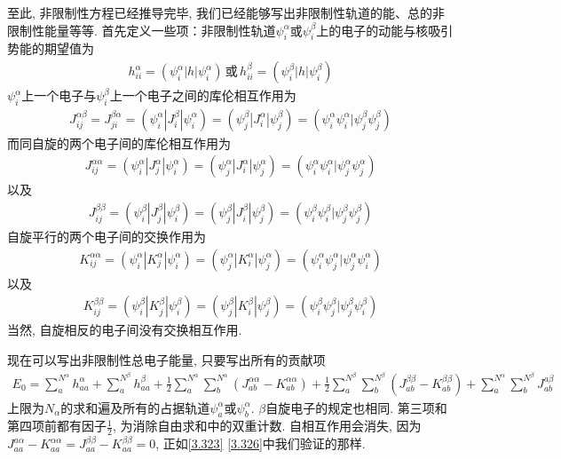 至此, 
非限制性\hft 方程已经推导完毕, 
我们已经能够写出非限制性轨道的能、总的非限制性能量等等. 
首先定义一些项：非限制性轨道$\psi_i^\alpha$或$\psi_i^\beta$上的电子的动能与核吸引势能的期望值为
\begin{align}\label{3.321}
	h_{ii}^\alpha = (\psi_i^\alpha|h|\psi_i^\alpha)\, \text{或}\, h_{ii}^\beta = (\psi_i^\beta|h|\psi_i^\beta)
\end{align}
$\psi_i^\alpha$上一个电子与$\psi_i^\beta$上一个电子之间的库伦相互作用为
\begin{align}\label{3.322}
	J_{ij}^{\alpha\beta} = J_{ji}^{\beta\alpha} = (\psi_i^\alpha|J_{i}^\beta|\psi_i^\alpha) = (\psi_j^\beta|J_{i}^\alpha|\psi_j^\beta) = (\psi_i^\alpha\psi_i^\alpha|\psi_j^\beta\psi_j^\beta)
\end{align}
而同自旋的两个电子间的库伦相互作用为
\begin{align}\label{3.323}
	J_{i j}^{\alpha \alpha}=(\psi_{i}^{\alpha}|J_{j}^{\alpha}| \psi_{i}^{\alpha})=(\psi_{j}^{\alpha}|J_{i}^{\alpha}| \psi_{j}^{\alpha})=(\psi_{i}^{\alpha} \psi_{i}^{\alpha} | \psi_{j}^{\alpha} \psi_{j}^{\alpha})
\end{align}
以及
\begin{align}\label{3.324}
	J_{i j}^{\beta \beta}=(\psi_{i}^{\beta}|J_{j}^{\beta}| \psi_{i}^{\beta})=(\psi_{j}^{\beta}|J_{i}^{\beta}| \psi_{j}^{\beta})=(\psi_{i}^{\beta} \psi_{i}^{\beta} | \psi_{j}^{\beta} \psi_{j}^{\beta})
\end{align}
自旋平行的两个电子间的交换作用为
\begin{align}\label{3.325}
	K_{i j}^{\alpha\alpha}=(\psi_{i}^{\alpha}|K_{j}^{\alpha}| \psi_{i}^{\alpha})=(\psi_{j}^{\alpha}|K_{i}^{\alpha}| \psi_{j}^{\alpha})=(\psi_{i}^{\alpha} \psi_{j}^{\alpha} | \psi_{j}^{\alpha} \psi_{i}^{\alpha})
\end{align}
以及
\begin{align}\label{3.326}
	K_{i j}^{\beta\beta}=(\psi_{i}^{\beta}|K_{j}^{\beta}| \psi_{i}^{\beta})=(\psi_{j}^{\beta}|K_{i}^{\beta}| \psi_{j}^{\beta})=(\psi_{i}^{\beta} \psi_{j}^{\beta} | \psi_{j}^{\beta} \psi_{i}^{\beta})
\end{align}
当然, 
自旋相反的电子间没有交换相互作用. 


现在可以写出非限制性总电子能量, 
只要写出所有的贡献项
\begin{align}
	\label{3.327}
	E_{0}=\sum_{a}^{N^{\alpha}} h_{a a}^{\alpha}+\sum_{a}^{N^{\beta}} h_{a a}^{\beta}+\frac{1}{2} \sum_{a}^{N^{\alpha}} \sum_{b}^{N^{\alpha}}\left(J_{a b}^{\alpha \alpha}-K_{a b}^{\alpha \alpha}\right)+\frac{1}{2} \sum_{a}^{N^{\beta}} \sum_{b}^{N^{\beta}}\left(J_{a b}^{\beta \beta}-K_{a b}^{\beta \beta}\right)+\sum_{a}^{N^{\alpha}} \sum_{b}^{N^{\beta}} J_{a b}^{a \beta}
\end{align}
上限为$N_\alpha$的求和遍及所有的占据轨道$\psi_a^\alpha$或$\psi_b^\alpha$. 
$\beta$自旋电子的规定也相同.  
第三项和第四项前都有因子$\frac{1}{2}$, 
为消除自由求和中的双重计数. 
自相互作用会消失, 
因为$J_{a a}^{a \alpha}-K_{a a}^{\alpha \alpha}=J_{a a}^{\beta \beta}-K_{a a}^{\beta \beta}=0$, 
正如\autoref{3.323} \autoref{3.326}中我们验证的那样. 

